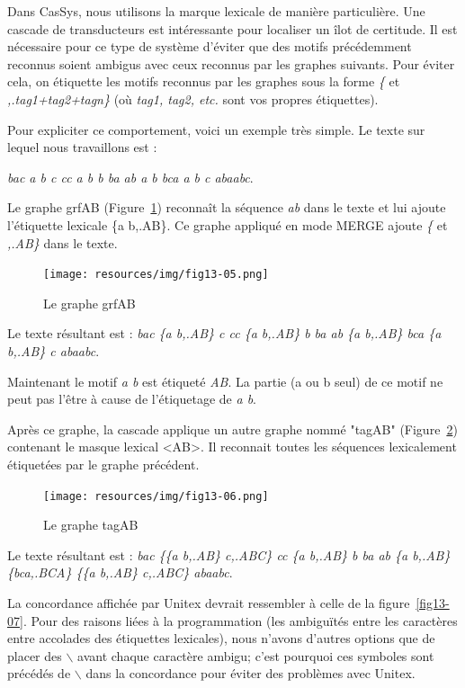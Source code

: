 \bigskip
\noindent Dans CasSys, nous utilisons la marque lexicale de manière particulière. Une cascade de
transducteurs est intéressante pour localiser un îlot de certitude. Il est nécessaire pour ce type
de système d'éviter que des motifs précédemment reconnus soient ambigus avec ceux reconnus par les
graphes suivants. Pour éviter cela, on étiquette les motifs reconnus par les graphes sous la forme
\emph{\{} et \emph{,.tag1+tag2+tagn\}} (où \emph{tag1, tag2, etc.} sont vos propres étiquettes).

\bigskip
\noindent Pour expliciter ce comportement, voici un exemple très simple. Le texte sur lequel nous
travaillons est :

\emph{bac a b c cc a b b ba ab a b bca a b c abaabc}.

\bigskip
\noindent Le graphe grfAB (Figure~\ref{fig13-05}) reconnaît la séquence \emph{ab} dans le texte et lui
ajoute l'étiquette lexicale \{a b,.AB\}. Ce graphe appliqué en mode MERGE ajoute \emph{\{ } et
 \emph{,.AB\}} dans le texte.

\begin{figure}[!htb]
  \centering
  \texttt{[image: resources/img/fig13-05.png]}
  \caption{Le graphe grfAB}
  \label{fig13-05}
\end{figure}

\bigskip
\noindent Le texte résultant est : \emph{bac \{a b,.AB\} c cc \{a b,.AB\} b ba ab \{a b,.AB\} bca
\{a b,.AB\} c abaabc}.

\bigskip
\noindent Maintenant le motif \emph{a b} est étiqueté \emph{AB}. La partie (a ou b seul) de ce
motif ne peut pas l'être à cause de l'étiquetage de \emph{a b}.

\bigskip
\noindent Après ce graphe, la cascade applique un autre graphe nommé "tagAB" (Figure~\ref{fig13-06})
contenant le masque lexical <AB>. Il reconnait toutes les séquences lexicalement étiquetées par le
graphe précédent.

\begin{figure}[!htb]
  \centering
  \texttt{[image: resources/img/fig13-06.png]}
  \caption{Le graphe tagAB}
  \label{fig13-06}
\end{figure}

\bigskip
\noindent Le texte résultant est : \emph{bac \{\{a b,.AB\} c,.ABC\} cc \{a b,.AB\} b ba ab \{a
b,.AB\} \{bca,.BCA\} \{\{a b,.AB\} c,.ABC\} abaabc}.


\bigskip
\noindent La concordance affichée par Unitex devrait ressembler à celle de la figure~\ref{fig13-07}. Pour des raisons liées à la programmation (les ambiguïtés entre les
	caractères entre accolades des étiquettes lexicales), nous n'avons d'autres options que de
placer des  $\backslash$ avant chaque caractère ambigu; c'est pourquoi ces symboles sont précédés de
$\backslash$ dans la concordance pour éviter des problèmes avec Unitex.

